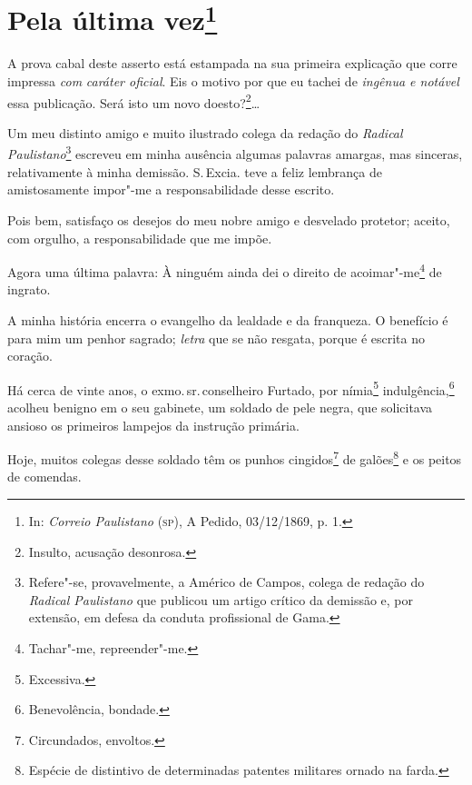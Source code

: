 \chapter{Pela última vez\footnote[*]{In: \emph{Correio Paulistano}
  (\textsc{sp}), A Pedido, 03/12/1869, p. 1.}}


A prova cabal deste asserto está estampada na sua primeira explicação
que corre impressa \emph{com} \emph{caráter oficial}. Eis o motivo por
que eu tachei de \emph{ingênua e notável} essa publicação. Será isto um
novo doesto?\footnote{Insulto, acusação desonrosa.}\ldots{}

Um meu distinto amigo e muito ilustrado colega da redação do
\emph{Radical Paulistano}\footnote{Refere"-se, provavelmente, a Américo
  de Campos, colega de redação do \emph{Radical Paulistano} que publicou
  um artigo crítico da demissão e, por extensão, em defesa da conduta
  profissional de Gama.} escreveu em minha ausência algumas palavras
amargas, mas sinceras, relativamente à minha demissão. S.\,Excia. teve a
feliz lembrança de amistosamente impor"-me a responsabilidade desse
escrito.

Pois bem, satisfaço os desejos do meu nobre amigo e desvelado protetor;
aceito, com orgulho, a responsabilidade que me impõe.

Agora uma última palavra:
À ninguém ainda dei o direito de acoimar"-me\footnote{Tachar"-me,
  repreender"-me.} de ingrato.

A minha história encerra o evangelho da lealdade e da franqueza. O
benefício é para mim um penhor sagrado; \emph{letra} que se não resgata,
porque é escrita no coração.

Há cerca de vinte anos, o exmo.\,sr.\,conselheiro Furtado, por
nímia\footnote{Excessiva.} indulgência,\footnote{Benevolência,
  bondade.} acolheu benigno em o seu gabinete, um soldado de pele
negra, que solicitava ansioso os primeiros lampejos da instrução
primária.

Hoje, muitos colegas desse soldado têm os punhos cingidos\footnote{
  Circundados, envoltos.} de galões\footnote{Espécie de distintivo de
  determinadas patentes militares ornado na farda.} e os peitos de
comendas.

